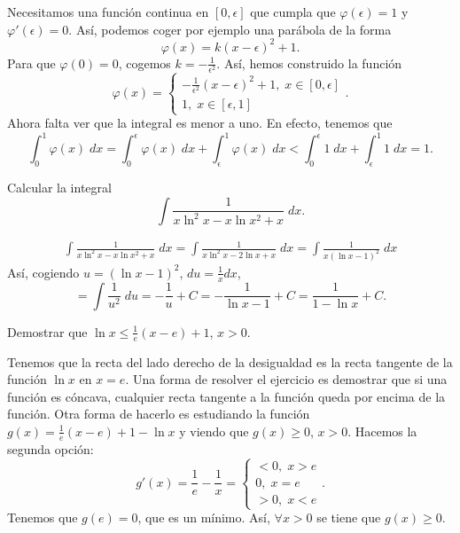 \documentclass{article}
\begin{document}
\begin{sol}
	Necesitamos una función continua en $\displaystyle \left[0,\epsilon \right]  $ que cumpla que $\displaystyle \varphi\left(\epsilon \right) = 1 $ y $\displaystyle \varphi'\left(\epsilon \right) = 0 $. Así, podemos coger por ejemplo una parábola de la forma
	\[ \varphi\left(x\right) = k\left(x-\epsilon \right)^{2} + 1 .\]
	Para que $\displaystyle \varphi\left(0\right) = 0 $, cogemos $\displaystyle k = -\frac{1}{\epsilon^{2}} $. Así, hemos construido la función
	\[\varphi\left(x\right) =
	\begin{cases}
		-\frac{1}{\epsilon ^{2}}\left(x-\epsilon \right)^{2}+1, \; x\in [0, \epsilon] \\
		1, \; x \in \left[\epsilon ,1\right] 
	\end{cases}
	.\]
Ahora falta ver que la integral es menor a uno. En efecto, tenemos que
\[\int^{1}_{0} \varphi\left(x\right) \; dx = \int^{\epsilon }_{0} \varphi\left(x\right) \; dx + \int^{1}_{\epsilon } \varphi\left(x\right) \; dx < \int^{\epsilon }_{0} 1 \; dx + \int^{1}_{\epsilon } 1 \; dx = 1 .\]
\end{sol}
\begin{ej}
Calcular la integral
\[\int \frac{1}{x\ln ^{2}x - x \ln x^{2} + x} \; dx .\]
\end{ej}
\begin{sol}
\[
\begin{split}
\int \frac{1}{x\ln ^{2}x - x \ln x^{2} + x} \; dx = \int \frac{1}{x\ln ^{2}x - 2\ln x + x} \; dx = \int \frac{1}{x\left(\ln x - 1\right)^{2}} \; dx
\end{split}
\]
Así, cogiendo $\displaystyle u = \left(\ln x-1\right)^{2} $, $\displaystyle du = \frac{1}{x}dx $,
\[ = \int \frac{1}{u^{2}} \; du = -\frac{1}{u} + C = -\frac{1}{\ln x - 1} + C = \frac{1}{1-\ln x} + C.\]
\end{sol}
\begin{ej}
Demostrar que $\displaystyle \ln x \leq \frac{1}{e}\left(x-e\right)+1 $, $\displaystyle x > 0 $.
\end{ej}
\begin{sol}
Tenemos que la recta del lado derecho de la desigualdad es la recta tangente de la función $\displaystyle \ln x $ en $\displaystyle x = e $. Una forma de resolver el ejercicio es demostrar que si una función es cóncava, cualquier recta tangente a la función queda por encima de la función. Otra forma de hacerlo es estudiando la función $\displaystyle g\left(x\right) = \frac{1}{e}\left(x-e\right)+1-\ln x $ y viendo que $\displaystyle g\left(x\right) \geq 0 $, $\displaystyle x > 0 $. Hacemos la segunda opción:
\[g'\left(x\right) = \frac{1}{e} - \frac{1}{x} =
\begin{cases}
< 0, \; x > e \\
0, \; x = e \\
> 0, \; x < e
\end{cases}
.\]
Tenemos que $\displaystyle g\left(e\right) = 0 $, que es un mínimo. Así, $\displaystyle \forall x > 0 $ se tiene que $\displaystyle g\left(x\right) \geq 0 $.
\end{sol}
\end{document}
